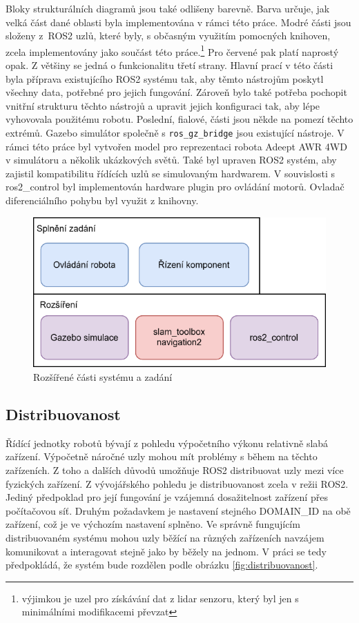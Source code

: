 Bloky strukturálních diagramů jsou také odlišeny barevně. Barva určuje, jak velká část dané oblasti byla implementována v rámci této práce. \textcolor[RGB]{108,142,191}{Modré} části jsou složeny z~ROS2 uzlů, které byly, s občasným využitím pomocných knihoven, zcela implementovány jako součást této práce.\footnote{výjimkou je uzel pro získávání dat z lidar senzoru, který byl jen s minimálními modifikacemi převzat} Pro \textcolor[RGB]{184,84,80}{červené} pak platí naprostý opak. Z většiny se jedná o funkcionalitu třetí strany. Hlavní prací v této části byla příprava existujícího ROS2 systému tak, aby těmto nástrojům poskytl všechny data, potřebné pro jejich fungování. Zároveň bylo také potřeba pochopit vnitřní strukturu těchto nástrojů a upravit jejich konfiguraci tak, aby lépe vyhovovala použitému robotu. Poslední, \textcolor[RGB]{150,115,166}{fialové}, části jsou někde na pomezí těchto extrémů. Gazebo simulátor společně s \verb|ros_gz_bridge| jsou existující nástroje. V rámci této práce byl vytvořen model pro reprezentaci robota Adeept AWR 4WD v simulátoru a několik ukázkových světů. Také byl upraven ROS2 systém, aby zajistil kompatibilitu řídících uzlů se simulovaným hardwarem. V souvislosti s ros2\_control byl implementován hardware plugin pro ovládání motorů. Ovladač diferenciálního pohybu byl využit z knihovny.

\begin{figure}[h!]
	\centering
	\includegraphics[scale=0.75]{obrazky-figures/zadání.pdf}
	\caption{Rozšířené části systému a zadání}
	\label{fig:zadani}
\end{figure}

\subsection*{Distribuovanost}
Řídící jednotky robotů bývají z pohledu výpočetního výkonu relativně slabá zařízení. Výpočetně náročné uzly mohou mít problémy s během na těchto zařízeních. Z toho a dalších důvodů umožňuje ROS2 distribuovat uzly mezi více fyzických zařízení. Z vývojářského pohledu je distribuovanost zcela v režii ROS2. Jediný předpoklad pro její fungování je vzájemná dosažitelnost zařízení přes počítačovou síť. Druhým požadavkem je nastavení stejného DOMAIN\_ID na obě zařízení, což je ve výchozím nastavení splněno. Ve správně fungujícím distribuovaném systému mohou uzly běžící na různých zařízeních navzájem komunikovat a interagovat stejně jako by běžely na jednom. V práci se tedy předpokládá, že systém bude rozdělen podle obrázku \ref{fig:distribuovanost}.

